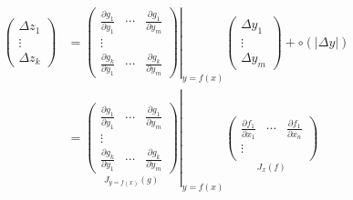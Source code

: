 \begin{align*}
    \begin{pmatrix}
        \Delta z_1 \\
        \vdots     \\
        \Delta z_k
    \end{pmatrix} & =\left.\begin{pmatrix}
                               \frac{\partial g_1}{\partial y_1} & \cdots & \frac{\partial g_1}{\partial y_m} \\
                               \vdots                            &        &                                   \\
                               \frac{\partial g_k}{\partial y_1} & \cdots & \frac{\partial g_k}{\partial y_m}
                           \end{pmatrix}\right|_{y=f(x)}\begin{pmatrix}
                                                            \Delta y_1 \\
                                                            \vdots     \\
                                                            \Delta y_m
                                                        \end{pmatrix}+\circ(|\Delta y|)                                                                                    \\
                    & =\left.\underset{J_{y=f(x)}(g)}{\begin{pmatrix}
                                                              \frac{\partial g_1}{\partial y_1} & \cdots & \frac{\partial g_1}{\partial y_m} \\
                                                              \vdots                            &        &                                   \\
                                                              \frac{\partial g_k}{\partial y_1} & \cdots & \frac{\partial g_k}{\partial y_m}
                                                          \end{pmatrix}}\right|_{y=f(x)}\left.\underset{J_{x}(f)}{\begin{pmatrix}
                                                                                                                      \frac{\partial f_1}{\partial x_1} & \cdots & \frac{\partial f_1}{\partial x_n} \\
                                                                                                                      \vdots                            &        &                                   \\

\end{pmatrix}}
\end{align*}
